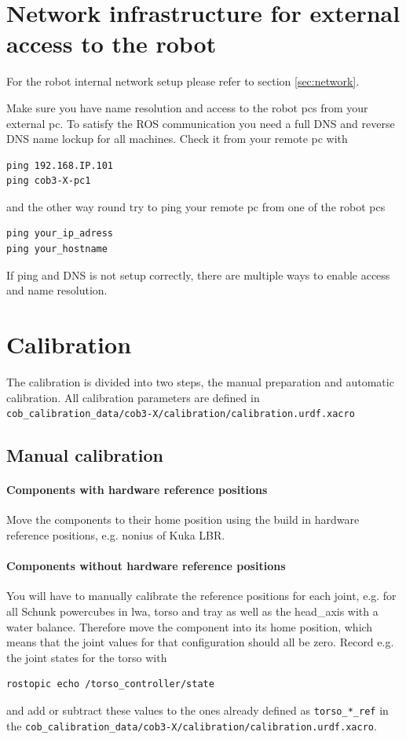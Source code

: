 \section{Network infrastructure for external access to the robot}
For the robot internal network setup please refer to section \ref{sec:network}.

Make sure you have name resolution and access to the robot pcs from your external pc. To satisfy the ROS communication you need a full DNS and reverse DNS name lockup for all machines. Check it from your remote pc with
\begin{lstlisting}
ping 192.168.IP.101
ping cob3-X-pc1
\end{lstlisting}
and the other way round try to ping your remote pc from one of the robot pcs
\begin{lstlisting}
ping your_ip_adress
ping your_hostname
\end{lstlisting}

If ping and DNS is not setup correctly, there are multiple ways to enable access and name resolution.


\section{Calibration}
The calibration is divided into two steps, the manual preparation and automatic calibration. All calibration parameters are defined in \texttt{cob\_calibration\_data/cob3-X/calibration/calibration.urdf.xacro}

\subsection{Manual calibration}\label{sec:manual_calibration}

\paragraph{Components with hardware reference positions}
Move the components to their home position using the build in hardware reference positions, e.g. nonius of Kuka LBR.

\paragraph{Components without hardware reference positions}
You will have to manually calibrate the reference positions for each joint, e.g. for all Schunk powercubes in lwa, torso and tray as well as the head\_axis with a water balance. Therefore move the component into its home position, which means that the joint values for that configuration should all be zero. Record e.g. the joint states for the torso with
\begin{lstlisting}
rostopic echo /torso_controller/state
\end{lstlisting}
and add or subtract these values to the ones already defined as \texttt{torso\_*\_ref} in the \texttt{cob\_calibration\_data/cob3-X/calibration/calibration.urdf.xacro}.

